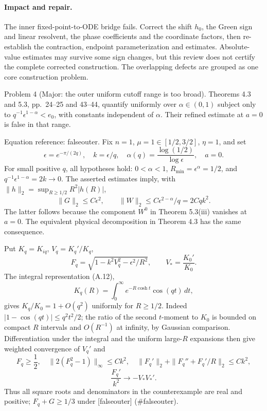 \documentclass[10pt]{article}
\begin{document}
\paragraph*{Impact and repair.}\mbox{}\par
The inner fixed-point-to-ODE bridge fails. Correct the shift \(h_0\), the Green sign and linear resolvent, the phase coefficients and the coordinate factors, then re-establish the contraction, endpoint parameterization and estimates. Absolute-value estimates may survive some sign changes, but this review does not certify the complete corrected construction. The overlapping defects are grouped as one core construction problem.\par
Problem 4 (Major: the outer uniform cutoff range is too broad).  Theorems 4.3 and 5.3, pp. 24–25 and 43–44, quantify uniformly over \(\alpha\in(0,1)\) subject only to \(q^{-1}\epsilon^{1-\alpha}<e_0\), with constants independent of \(\alpha\). Their refined estimate at \(a=0\) is false in that range.\par
Equation reference: falseouter. Fix \(n=1\), \(\mu=1\in[1/2,3/2]\), \(\eta=1\), and set \[\epsilon=e^{-\pi/(2q)},\quad k=\epsilon/q,\quad
 \alpha(q)=\frac{\log(1/2)}{\log\epsilon},\quad a=0.\] For small positive \(q\), all hypotheses hold: \(0<\alpha<1\), \(R_{\min}=\epsilon^\alpha=1/2\), and \(q^{-1}\epsilon^{1-\alpha}=2k\to0\). The asserted estimates imply, with \(\|h\|_2=\sup_{R\ge1/2}R^2|h(R)|\), \[
 \|G\|_2\le C\epsilon^2,\qquad
 \|W\|_2\le C\epsilon^{2-\alpha}/q=2Cqk^2.\] The latter follows because the component \(W^0\) in Theorem 5.3(iii) vanishes at \(a=0\). The equivalent physical decomposition in Theorem 4.3 has the same consequence.\par
Put \(K_q=K_{iq}\), \(V_q=K_q'/K_q\), \[F_q=\sqrt{1-k^2V_q^2-\epsilon^2/R^2},\qquad V_*=\frac{K_0'}{K_0}.\] The integral representation (A.12), \[K_q(R)=\int_0^\infty e^{-R\cosh t}\cos(qt)\,dt,\] gives \(K_q/K_0=1+O(q^2)\) uniformly for \(R\ge1/2\). Indeed \(|1-\cos(qt)|\le q^2t^2/2\); the ratio of the second \(t\)-moment to \(K_0\) is bounded on compact \(R\) intervals and \(O(R^{-1})\) at infinity, by Gaussian comparison. Differentiation under the integral and the uniform large-\(R\) expansions then give weighted convergence of \(V_q'\) and \[F_q\ge\frac12,\quad
 \|2(F_q^2-1)\|_\infty\le Ck^2,\quad
 \|F_q'\|_2+\|F_q''+F_q'/R\|_2\le Ck^2,\] \[\frac{F_q'}{k^2}\longrightarrow -V_*V_*'.\] Thus all square roots and denominators in the counterexample are real and positive; \(F_q+G\ge1/3\) under [falseouter] (\#falseouter).\par
\end{document}

